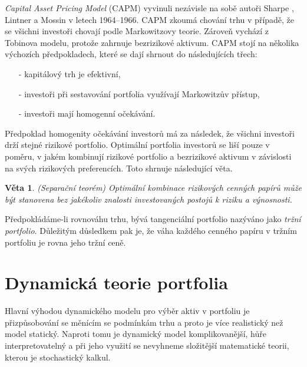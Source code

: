 \documentclass[a4paper,12pt]{report}
\newtheorem{veta}{Věta}
\theoremstyle{definition} \newtheorem{definice}[veta]{Definice}
\theoremstyle{remark}
\begin{document}
\textit{Capital Asset Pricing Model} (CAPM) vyvinuli nezávisle na sobě autoři Sharpe \cite{sharpe1964}, Lintner \cite{lintner1965} a Mossin \cite{mossin1966} v letech 1964--1966. CAPM zkoumá chování trhu v případě, že se všichni investoři chovají podle Markowitzovy teorie.
Zároveň vychází z Tobinova modelu, protože zahrnuje bezrizikové aktivum.
CAPM stojí na několika výchozích předpokladech, které se dají shrnout do následujících třech:
\begin{itemize}
\item[-] kapitálový trh je efektivní,
\item[-] investoři při sestavování portfolia využívají Markowitzův přístup,
\item[-] investoři mají homogenní očekávání.
\end{itemize}
Předpoklad homogenity očekávání investorů má za následek, že všichni investoři drží stejné rizikové portfolio.
Optimální portfolia investorů se liší pouze v poměru, v jakém kombinují rizikové portfolio a bezrizikové aktivum v závislosti na svých rizikových preferencích.
Toto shrnuje následující věta.

\begin{veta}(Separační teorém)
Optimální kombinace rizikových cenných papírů může být stanovena bez jakékoliv znalosti investovaných postojů k riziku a výnosnosti.
\end{veta}

Předpokládáme-li rovnováhu trhu, bývá tangenciální portfolio nazýváno jako \textit{tržní portfolio}.
Důležitým důsledkem pak je, že váha každého cenného papíru v tržním portfoliu je rovna jeho tržní ceně. \label{vahy_trznihodnota}



\section{Dynamická teorie portfolia}
Hlavní výhodou dynamického modelu pro výběr aktiv v portfoliu je přizpůsobování se měnícím se podmínkám trhu a proto je více realistický než model statický.
Naproti tomu je dynamický model komplikovanější, hůře interpretovatelný a při jeho využití se nevyhneme složitější matematické teorii, kterou je stochastický kalkul.
\end{document}
